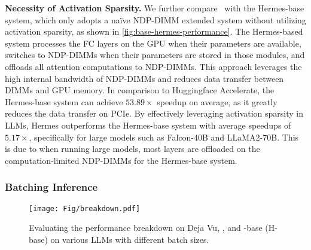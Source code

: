 \textbf{Necessity of Activation Sparsity. } We further compare \name~with the Hermes-base system, which only adopts a na\"ive NDP-DIMM extended system without utilizing activation sparsity, as shown in \fig \ref{fig:base-hermes-performance}. 
The Hermes-based system processes the FC layers on the GPU when their parameters are available, switches to NDP-DIMMs when their parameters are stored in those modules, and offloads all attention computations to NDP-DIMMs.
This approach leverages the high internal bandwidth of NDP-DIMMs and
reduces data transfer between DIMMs and GPU memory. In comparison to Huggingface Accelerate, the Hermes-base system can achieve $53.89 \times$ speedup on average, as it greatly reduces the data transfer on PCIe. By effectively leveraging activation sparsity in LLMs, Hermes outperforms the Hermes-base system with average speedups of $5.17 \times$, specifically for large models such as Falcon-40B and
LLaMA2-70B. This is due to when running large models, most layers are offloaded on the computation-limited NDP-DIMMs for the Hermes-base system. 




\subsubsection{Batching Inference}

\begin{figure*}
    \centering
    \texttt{[image: Fig/breakdown.pdf]}
    \vspace{-0.3cm}
    \caption{Evaluating the performance breakdown on Deja Vu, \name, and \name-base (H-base) on various LLMs with different batch sizes. }
    \label{fig:performance-breakdown}
\vspace{-0.3cm}
\end{figure*}

